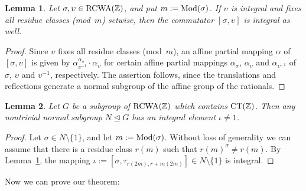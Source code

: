 \documentclass{amsart}
\theoremstyle{definition} \newtheorem{CTZDefinition}{Definition}[section]
\theoremstyle{plain}      \newtheorem{CTZPropertiesTheorem}[CTZDefinition]{Theorem}
\theoremstyle{plain}      \newtheorem{CTZSubgroupsTheorem}[CTZDefinition]{Theorem}
\theoremstyle{definition} \newtheorem{RcwaMappingDefinition}{Definition}[section]
\theoremstyle{definition} \newtheorem{RCWADefinition}[RcwaMappingDefinition]{Definition}
\theoremstyle{plain}      \newtheorem{CTZNotFinitelyGeneratedTheorem}
\theoremstyle{definition} \newtheorem{CTZSmEmbeddingDefinition}[RcwaMappingDefinition]{Definition}
\theoremstyle{plain}      \newtheorem{CTZHighlyTransitiveTheorem}[RcwaMappingDefinition]{Theorem}
\theoremstyle{plain}      \newtheorem{CTZTorsionElementsDivisibleTheorem}
\theoremstyle{plain}      \newtheorem{CTLemma}{Lemma}[section]
\theoremstyle{plain}      \newtheorem{IntegralCommutatorLemma}[CTLemma]{Lemma}
\theoremstyle{plain}      \newtheorem{NormalSubgroupContainsIntegralElementLemma}[CTLemma]{Lemma}
\theoremstyle{plain}      \newtheorem{CTZSimpleTheorem}[CTLemma]{Theorem}
\theoremstyle{remark}     \newtheorem{CTZSimpleRemark}[CTLemma]{Remark}
\theoremstyle{definition} \newtheorem{CTPZDefinition}[CTLemma]{Definition}
\theoremstyle{plain}      \newtheorem{CTPZSimpleCorollary}[CTLemma]{Corollary}
\theoremstyle{plain}      \newtheorem{CTPZSimpleProblem}[CTLemma]{Problem}
\theoremstyle{plain}      \newtheorem{FnPSL2ZEmbeddingTheorem}{Theorem}[section]
\theoremstyle{plain}      \newtheorem{FreeProductEmbeddingTheorem}[FnPSL2ZEmbeddingTheorem]{Theorem}
\theoremstyle{definition} \newtheorem{RestrictionMonomorphismDefinition}
\theoremstyle{plain}      \newtheorem{DirectAndWreathProductsEmbeddingTheorem}
\theoremstyle{plain}      \newtheorem{DirectAndWreathProductsEmbeddingCorollary}
\theoremstyle{definition} \newtheorem{CTintZDefinition}[FnPSL2ZEmbeddingTheorem]{Definition}
\theoremstyle{plain}      \newtheorem{CTintZSimpleTheorem}[FnPSL2ZEmbeddingTheorem]{Theorem}
\theoremstyle{definition} \newtheorem{KernelDefinition}{Definition}[section]
\theoremstyle{definition} \newtheorem{TameWildDefinition}[KernelDefinition]{Definition}
\theoremstyle{definition} \newtheorem{SimpleSupergroupsDefinition}[KernelDefinition]{Definition}
\theoremstyle{definition} \newtheorem{CSCRDefinition}[KernelDefinition]{Definition}
\theoremstyle{plain}      \newtheorem{SimpleSupergroupsGeneratorsTheorem}[KernelDefinition]{Theorem}
\theoremstyle{plain}      \newtheorem{SimpleSupergroupsTheorem}[KernelDefinition]{Theorem}
\theoremstyle{plain}      \newtheorem{SimpleSupergroupsTransitivityTheorem}
\theoremstyle{plain}      \newtheorem{TameGenerationConjecture}[KernelDefinition]{Conjecture}
\theoremstyle{remark}     \newtheorem{TameGenerationRemark}[KernelDefinition]{Remark}
\begin{document}
\begin{IntegralCommutatorLemma} \label{IntegralCommutatorLemma}
  Let \(\sigma, \upsilon \in \RCWA{\ZZ}\), and put \(m := \Mod{\sigma}\).
  If \(\upsilon\) is integral and fixes all residue classes (mod~\(m\)) setwise,
  then the commutator \([\sigma,\upsilon]\) is integral as well.
\end{IntegralCommutatorLemma}
\begin{proof}
  Since \(\upsilon\) fixes all residue classes (mod~\(m\)), an affine partial mapping \(\alpha\)
  of \([\sigma,\upsilon]\) is given by \(\alpha_{\upsilon^{-1}}^{\alpha_{\sigma}} \cdot
  \alpha_{\upsilon}\) for certain affine partial mappings \(\alpha_{\sigma}\), \(\alpha_{\upsilon}\)
  and \(\alpha_{\upsilon^{-1}}\) of \(\sigma\), \(\upsilon\) and \(\upsilon^{-1}\), respectively.
  The assertion follows, since the translations and reflections generate a normal subgroup of the
  affine group of the rationals.
\end{proof}

\begin{NormalSubgroupContainsIntegralElementLemma}
\label{NormalSubgroupContainsIntegralElementLemma}
  Let \(G\) be a subgroup of \(\RCWA{\ZZ}\) which contains \(\CT{\ZZ}\).
  Then any nontrivial normal subgroup \(N \unlhd G\) has an integral element \(\iota \neq 1\).
\end{NormalSubgroupContainsIntegralElementLemma}
\begin{proof}
  Let \(\sigma \in N \setminus \{1\}\), and let \(m := \Mod{\sigma}\).
  Without loss of generality we can assume that there is a residue class \(r(m)\)
  such that \(r(m)^\sigma \neq r(m)\). By Lemma~\ref{IntegralCommutatorLemma},
  the mapping \(\iota := [\sigma,\tau_{r(2m),r+m(2m)}] \in N \setminus \{1\}\) is integral.
\end{proof}

\noindent Now we can prove our theorem:
\end{document}
